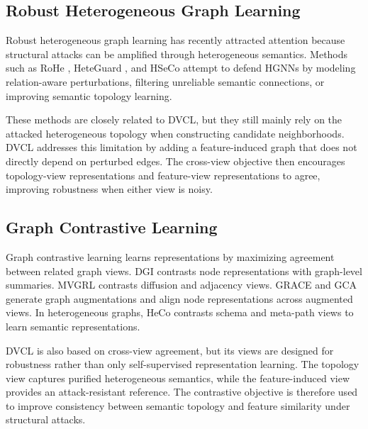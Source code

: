 \subsection{Robust Heterogeneous Graph Learning}

Robust heterogeneous graph learning has recently attracted attention because structural attacks can be amplified through heterogeneous semantics. Methods such as RoHe \cite{rohe}, HeteGuard \cite{heteguard}, and HSeCo \cite{hseco} attempt to defend HGNNs by modeling relation-aware perturbations, filtering unreliable semantic connections, or improving semantic topology learning.

These methods are closely related to DVCL, but they still mainly rely on the attacked heterogeneous topology when constructing candidate neighborhoods. DVCL addresses this limitation by adding a feature-induced graph that does not directly depend on perturbed edges. The cross-view objective then encourages topology-view representations and feature-view representations to agree, improving robustness when either view is noisy.

\subsection{Graph Contrastive Learning}

Graph contrastive learning learns representations by maximizing agreement between related graph views. DGI \cite{velickovic2019dgi} contrasts node representations with graph-level summaries. MVGRL \cite{hassani2020mvgrl} contrasts diffusion and adjacency views. GRACE \cite{zhu2020grace} and GCA \cite{zhu2021gca} generate graph augmentations and align node representations across augmented views. In heterogeneous graphs, HeCo \cite{wang2021heco} contrasts schema and meta-path views to learn semantic representations.

DVCL is also based on cross-view agreement, but its views are designed for robustness rather than only self-supervised representation learning. The topology view captures purified heterogeneous semantics, while the feature-induced view provides an attack-resistant reference. The contrastive objective is therefore used to improve consistency between semantic topology and feature similarity under structural attacks.


